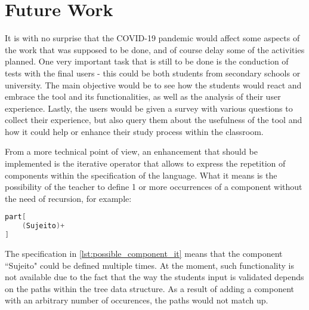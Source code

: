 \section{Future Work} %

It is with no surprise that the COVID-19 pandemic would affect some aspects of the work that was supposed to be done, and of course delay some of the activities planned.
One very important task that is still to be done is the conduction of tests with the final users - this could be both students from secondary schools or university.
The main objective would be to see how the students would react and embrace the tool and its functionalities, as well as the analysis of their user experience.
Lastly, the users would be given a survey with various questions to collect their experience,
but also query them about the usefulness of the tool and how it could help or enhance their study process within the classroom.

From a more technical point of view, an enhancement that should be implemented is the iterative operator that allows to express the repetition of components within the specification of the language.
What it means is the possibility of the teacher to define 1 or more occurrences of a component without the need of recursion, for example:

\begin{center}
\begin{minipage}{8cm}
\begin{lstlisting}[language=java, basicstyle=\small, label={lst:possible_component_it}, caption=Example of a possible use for the iterative operator.]
part[
    (Sujeito)+
]
\end{lstlisting}
\end{minipage}
\end{center}

The specification in \autoref{lst:possible_component_it} means that the component ``Sujeito" could be defined multiple times.
At the moment, such functionality is not available due to the fact that the way the students input is validated depends on the paths within the tree data structure.
As a result of adding a component with an arbitrary number of occurences, the paths would not match up.


